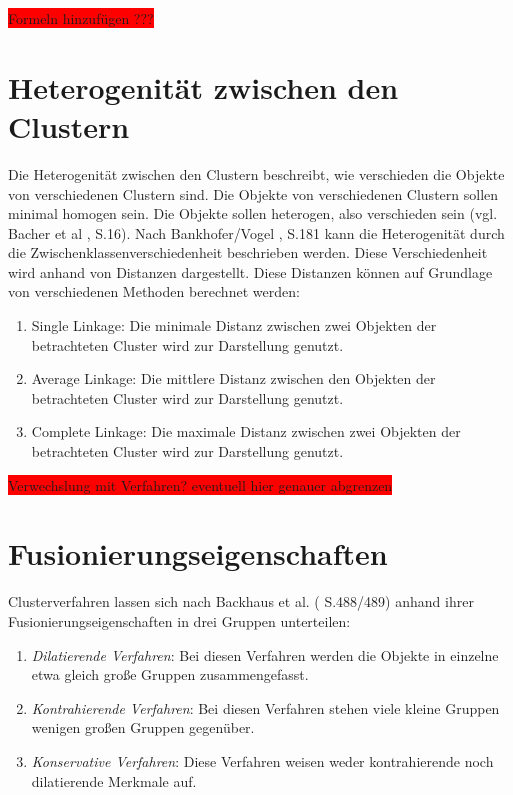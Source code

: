 \colorbox{red}{Formeln hinzufügen ???}
\section{Heterogenität zwischen den Clustern}
Die Heterogenität zwischen den Clustern beschreibt, wie verschieden die Objekte von verschiedenen Clustern sind. Die Objekte von verschiedenen Clustern sollen minimal homogen sein. Die Objekte sollen heterogen, also verschieden sein (vgl. Bacher et al \cite{Bacher.2010}, S.16).
Nach Bankhofer/Vogel \cite{Bankhofer.2008}, S.181 kann die Heterogenität durch die Zwischenklassenverschiedenheit beschrieben werden. Diese Verschiedenheit wird anhand von Distanzen dargestellt. Diese Distanzen können auf Grundlage von verschiedenen Methoden berechnet werden:
\begin{enumerate}
        \item Single Linkage: Die minimale Distanz zwischen zwei Objekten der betrachteten Cluster wird zur Darstellung genutzt.
        \item Average Linkage: Die mittlere Distanz zwischen den Objekten der betrachteten Cluster wird zur Darstellung genutzt.
        \item Complete Linkage: Die maximale Distanz zwischen zwei Objekten der betrachteten Cluster wird zur Darstellung genutzt.
\end{enumerate}
\colorbox{red}{Verwechslung mit Verfahren? eventuell hier genauer abgrenzen}

\section{Fusionierungseigenschaften}
Clusterverfahren lassen sich nach Backhaus et al. (\cite{Backhaus.2016} S.488/489) anhand ihrer Fusionierungseigenschaften in drei Gruppen unterteilen:
\begin{enumerate}
        \item \textit{Dilatierende Verfahren}: Bei diesen Verfahren werden die Objekte in einzelne etwa gleich große Gruppen zusammengefasst.
        \item \textit{Kontrahierende Verfahren}: Bei diesen Verfahren stehen viele kleine Gruppen wenigen großen Gruppen gegenüber.
        \item \textit{Konservative Verfahren}: Diese Verfahren weisen weder kontrahierende noch dilatierende Merkmale auf.
\end{enumerate}
